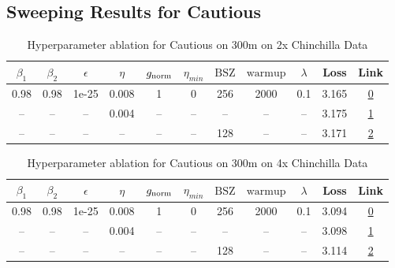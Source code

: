 \subsection{Sweeping Results for Cautious}%
\begin{table}[H]
\centering
\caption{Hyperparameter ablation for Cautious on 300m on 2x Chinchilla Data}
\label{tab:ablation_cautious_300m_on_2x_chinchilla_data}
\begin{tabular}{ccccccccccc}
\toprule
$\beta_1$ & $\beta_2$ & $\epsilon$ & $\eta$ & $g_{\mathrm{norm}}$ & $\eta_{min}$ & $\mathrm{BSZ}$ & $\mathrm{warmup}$ & $\lambda$ & Loss & Link \\
\midrule
0.98 & 0.98 & 1e-25 & 0.008 & 1 & 0 & 256 & 2000 & 0.1 & 3.165 & \href{https://wandb.ai/marin-community/optimizer-scaling/runs/sweep-300m-12B-cautious008d65lr0.008-wd0.1-minlr0-warmup2000-b10-69dcda}{0} \\
\midrule
-- & -- & -- & 0.004 & -- & -- & -- & -- & -- & 3.175 & \href{https://wandb.ai/marin-community/optimizer-scaling/runs/sweep-300m-12B-cautious188cablr0.004-wd0.1-minlr0-warmup2000-b10-be1c3d}{1} \\
-- & -- & -- & -- & -- & -- & 128 & -- & -- & 3.171 & \href{https://wandb.ai/marin-community/optimizer-scaling/runs/sweep-300m-12B-cautious820e4dlr0.008-wd0.1-minlr0-warmup2000-b10-fe955e}{2} \\
\bottomrule
\end{tabular}
\end{table}

\begin{table}[H]
\centering
\caption{Hyperparameter ablation for Cautious on 300m on 4x Chinchilla Data}
\label{tab:ablation_cautious_300m_on_4x_chinchilla_data}
\begin{tabular}{ccccccccccc}
\toprule
$\beta_1$ & $\beta_2$ & $\epsilon$ & $\eta$ & $g_{\mathrm{norm}}$ & $\eta_{min}$ & $\mathrm{BSZ}$ & $\mathrm{warmup}$ & $\lambda$ & Loss & Link \\
\midrule
0.98 & 0.98 & 1e-25 & 0.008 & 1 & 0 & 256 & 2000 & 0.1 & 3.094 & \href{https://wandb.ai/marin-community/optimizer-scaling/runs/sweep-300m-24B-cautious820e4dlr0.008-wd0.1-minlr0-warmup2000-b10-fe0a65}{0} \\
\midrule
-- & -- & -- & 0.004 & -- & -- & -- & -- & -- & 3.098 & \href{https://wandb.ai/marin-community/optimizer-scaling/runs/sweep-300m-24B-cautious2e72c8lr0.004-wd0.1-minlr0-warmup2000-b10-13950f}{1} \\
-- & -- & -- & -- & -- & -- & 128 & -- & -- & 3.114 & \href{https://wandb.ai/marin-community/optimizer-scaling/runs/sweep-300m-24B-cautious1c558clr0.008-wd0.1-minlr0-warmup2000-b10-69130a}{2} \\
\bottomrule
\end{tabular}
\end{table}


